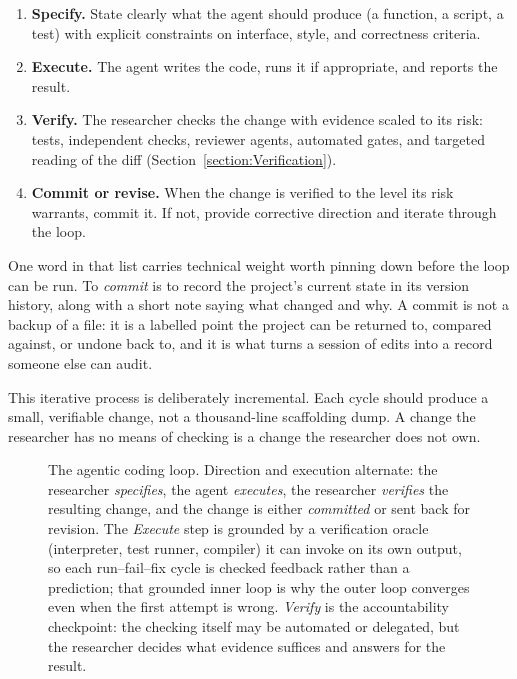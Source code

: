 \begin{enumerate}
\item \textbf{Specify.} State clearly what the agent should produce (a function, a script, a test) with explicit constraints on interface, style, and correctness criteria.
\item \textbf{Execute.} The agent writes the code, runs it if appropriate, and reports the result.
\item \textbf{Verify.} The researcher checks the change with evidence scaled to its risk: tests, independent checks, reviewer agents, automated gates, and targeted reading of the diff (Section~\ref{section:Verification}).
\item \textbf{Commit or revise.} When the change is verified to the level its risk warrants, commit it. If not, provide corrective direction and iterate through the loop.
\end{enumerate}

One word in that list carries technical weight worth pinning down before the loop can be run.
To \emph{commit} is to record the project's current state in its version history, along with a short note saying what changed and why.
A commit is not a backup of a file: it is a labelled point the project can be returned to, compared against, or undone back to, and it is what turns a session of edits into a record someone else can audit.

This iterative process is deliberately incremental.
Each cycle should produce a small, verifiable change, not a thousand-line scaffolding dump.
A change the researcher has no means of checking is a change the researcher does not own.

\begin{figure}[htb!]
\begin{center}

\caption{The agentic coding loop.
Direction and execution alternate: the researcher \emph{specifies}, the agent \emph{executes}, the researcher \emph{verifies} the resulting change, and the change is either \emph{committed} or sent back for revision.
The \emph{Execute} step is grounded by a verification oracle (interpreter, test runner, compiler) it can invoke on its own output, so each run--fail--fix cycle is checked feedback rather than a prediction; that grounded inner loop is why the outer loop converges even when the first attempt is wrong.
\emph{Verify} is the accountability checkpoint: the checking itself may be automated or delegated, but the researcher decides what evidence suffices and answers for the result.}
\label{figure:AgenticCodingLoop}
\end{center}
\end{figure}

